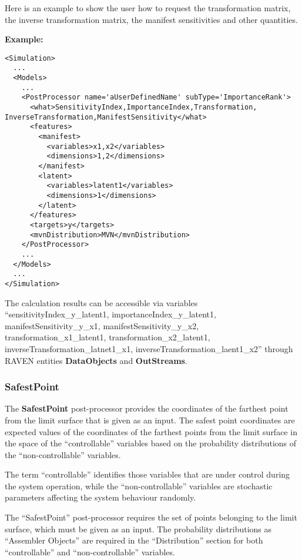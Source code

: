   Here is an example to show the user how to request the transformation matrix, the inverse transformation matrix, the
  manifest sensitivities and other quantities.

\textbf{Example:}
\begin{lstlisting}[style=XML,morekeywords={name,subType,debug}]
<Simulation>
  ...
  <Models>
    ...
    <PostProcessor name='aUserDefinedName' subType='ImportanceRank'>
      <what>SensitivityIndex,ImportanceIndex,Transformation, InverseTransformation,ManifestSensitivity</what>
      <features>
        <manifest>
          <variables>x1,x2</variables>
          <dimensions>1,2</dimensions>
        </manifest>
        <latent>
          <variables>latent1</variables>
          <dimensions>1</dimensions>
        </latent>
      </features>
      <targets>y</targets>
      <mvnDistribution>MVN</mvnDistribution>
    </PostProcessor>
    ...
  </Models>
  ...
</Simulation>
\end{lstlisting}

The calculation results can be accessible via variables ``sensitivityIndex\_y\_latent1, importanceIndex\_y\_latent1,
manifestSensitivity\_y\_x1, manifestSensitivity\_y\_x2, transformation\_x1\_latent1, transformation\_x2\_latent1,
inverseTransformation\_latnet1\_x1, inverseTransformation\_laent1\_x2'' through RAVEN entities \textbf{DataObjects}
and \textbf{OutStreams}.

\subsubsection{SafestPoint}
\label{SafestPoint}
The \textbf{SafestPoint} post-processor provides the coordinates of the farthest
point from the limit surface that is given as an input.
%
The safest point coordinates are expected values of the coordinates of the
farthest points from the limit surface in the space of the ``controllable''
variables based on the probability distributions of the ``non-controllable''
variables.

The term ``controllable'' identifies those variables that are under control
during the system operation, while the ``non-controllable'' variables are
stochastic parameters affecting the system behaviour randomly.

The ``SafestPoint'' post-processor requires the set of points belonging to the
limit surface, which must be given as an input.
%
The probability distributions as ``Assembler Objects'' are required in the
``Distribution'' section for both ``controllable'' and ``non-controllable''
variables.

